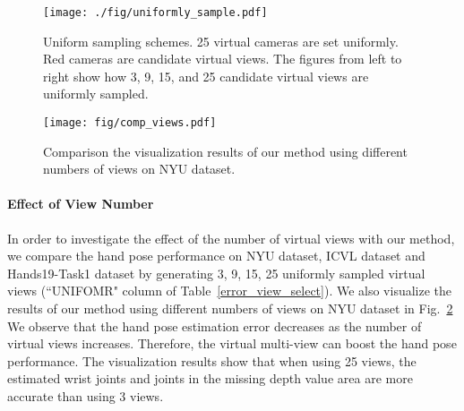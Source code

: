 \documentclass[letterpaper]{article} \usepackage{aaai22}  \usepackage{times}  \usepackage{helvet}  \usepackage{courier}  \usepackage[hyphens]{url}  \usepackage{graphicx} \urlstyle{rm} \def\UrlFont{\rm}  \usepackage{natbib}  \usepackage{caption} \DeclareCaptionStyle{ruled}{labelfont=normalfont,labelsep=colon,strut=off} \frenchspacing  \setlength{\pdfpagewidth}{8.5in}  \setlength{\pdfpageheight}{11in}  \usepackage{algorithm}
\begin{document}
\begin{figure}[ht]
\centering 
\texttt{[image: ./fig/uniformly\_sample.pdf]}
\caption{Uniform sampling schemes. 25 virtual cameras are set uniformly. Red cameras are candidate virtual views. The figures from left to right show how 3, 9, 15, and 25 candidate virtual views are uniformly sampled.}
\label{fig:uniformly_sample}
\end{figure}

\begin{figure}[ht]
    \centering 
    \texttt{[image: fig/comp\_views.pdf]}
    \caption{Comparison the visualization results of our method using different numbers of views on NYU dataset.}
    \label{fig:comp_views}
\end{figure}

\paragraph{Effect of View Number}
In order to investigate the effect of the number of virtual views with our method, we compare the hand pose performance on NYU dataset, ICVL dataset and Hands19-Task1 dataset by generating 3, 9, 15, 25 uniformly sampled virtual views (``UNIFOMR" column of Table~\ref{error_view_select}).
We also visualize the results of our method using different numbers of views on NYU dataset in Fig.~\ref{fig:comp_views}
We observe that the hand pose estimation error decreases as the number of virtual views increases. Therefore, the virtual multi-view can boost the hand pose performance. The visualization results show that when using 25 views, the estimated wrist joints and joints in the missing depth value area are more accurate than using 3 views.
\end{document}
